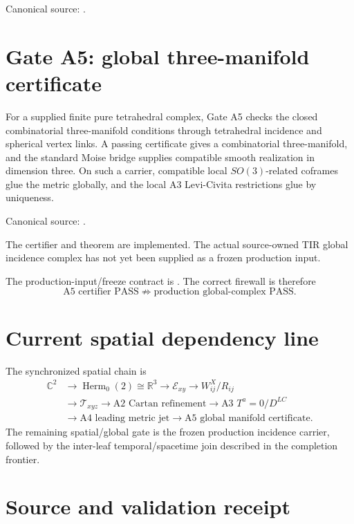 Canonical source:
.

\section{Gate A5: global three-manifold certificate}

For a supplied finite pure tetrahedral complex, Gate A5 checks the closed
combinatorial three-manifold conditions through tetrahedral incidence and
spherical vertex links.  A passing certificate gives a combinatorial
three-manifold, and the standard Moise bridge supplies compatible smooth
realization in dimension three.  On such a carrier, compatible local
\(SO(3)\)-related coframes glue the metric globally, and the local A3
Levi-Civita restrictions glue by uniqueness.

Canonical source:
.

The certifier and theorem are implemented.  The actual source-owned TIR global
incidence complex has not yet been supplied as a frozen production input.

The production-input/freeze contract is
.
The correct firewall is therefore
\[
\boxed{
\text{A5 certifier PASS}
\not\Rightarrow
\text{production global-complex PASS}.
}
\]

\section{Current spatial dependency line}

The synchronized spatial chain is
\[
\boxed{
\begin{aligned}
\mathbb C^2
&\to\operatorname{Herm}_0(2)\cong\mathbb R^3
\to\mathcal E_{xy}
\to W_{ij}^{X}/R_{ij}\\
&\to\mathcal T_{xyz}
\to\text{A2 Cartan refinement}
\to\text{A3 }T^a=0/D^{LC}\\
&\to\text{A4 leading metric jet}
\to\text{A5 global manifold certificate}.
\end{aligned}
}
\]
The remaining spatial/global gate is the frozen production incidence carrier,
followed by the inter-leaf temporal/spacetime join described in the completion
frontier.

\section{Source and validation receipt}

